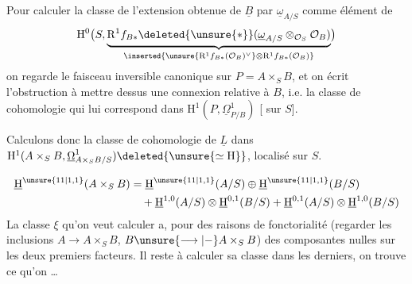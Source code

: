 Pour calculer la classe de l'extension obtenue de $\underline{B}$ par $\underline{\omega}_{A/S}$ comme élément de
\[
\mathrm{H}^0\bigl(S,\underbrace{\mathrm{R}^1f_{B*}\deleted{\unsure{*}}(\underline{\omega}_{A/S}\otimes_{\mathcal{O}_S}\mathcal{O}_B)}_{\inserted{\unsure{\mathrm{R}^1f_{B*}(\mathcal{O}_B)^\vee}\otimes\mathrm{R}^1f_{B*}(\mathcal{O}_B)}}\bigr)
\]
on regarde  le faisceau inversible canonique sur $P=A\times_S B$, et on écrit l'obstruction à mettre dessus une connexion relative à $B$, i.e. la classe de cohomologie qui lui correspond dans $\mathrm{H}^1(P,\underline{\Omega}^1_{P/B})$ [ sur $S$].

Calculons donc la classe de cohomologie de $\underline{L}$ dans $\mathrm{H}^1(A\times_S B,\underline{\Omega}^1_{A\times_S B/S})\deleted{\unsure{\simeq\mathrm{H}}}$, localisé sur $S$.


\[
\begin{aligned}
\underline{\mathrm{H}}^{\unsure{11|1,1}}(A\times_S B)&=\underline{\mathrm{H}}^{\unsure{11|1,1}}(A/S)\oplus\underline{\mathrm{H}}^{\unsure{11|1,1}}(B/S)\\
&\quad+\underline{\mathrm{H}}^{1,0}(A/S)\otimes\underline{\mathrm{H}}^{0,1}(B/S)+\underline{\mathrm{H}}^{0,1}(A/S)\otimes\underline{\mathrm{H}}^{1,0}(B/S)
\end{aligned}
\]
La classe $\xi$ qu'on veut calculer a, pour des raisons de fonctorialité (regarder les inclusions $A\longrightarrow A\times_S B$, $B\unsure{\longrightarrow|{-}}A\times_S B$) des composantes nulles sur les deux premiers facteurs. Il reste à calculer sa classe dans les derniers, on trouve ce qu'on \ldots



